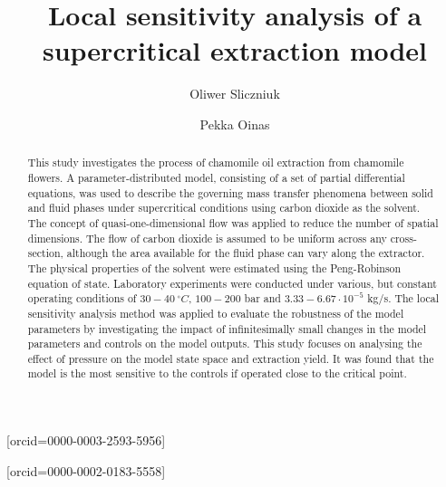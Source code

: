 \documentclass[a4paper,fleqn]{cas-dc}
\begin{document}
 
	
	\title[mode=title]{Local sensitivity analysis of a supercritical extraction model}                      
	
	
	\author[1]{Oliwer Sliczniuk}[orcid=0000-0003-2593-5956]
	\cormark[1]
	
	\author[1]{Pekka Oinas}[orcid=0000-0002-0183-5558]
	
	
	\address[1]{Aalto University, School of Chemical Engineering, Espoo, 02150, Finland}
	
	
	\begin{abstract}
	This study investigates the process of chamomile oil extraction from chamomile flowers. A parameter-distributed model, consisting of a set of partial differential equations, was used to describe the governing mass transfer phenomena between solid and fluid phases under supercritical conditions using carbon dioxide as the solvent. The concept of quasi-one-dimensional flow was applied to reduce the number of spatial dimensions. The flow of carbon dioxide is assumed to be uniform across any cross-section, although the area available for the fluid phase can vary along the extractor. The physical properties of the solvent were estimated using the Peng-Robinson equation of state. Laboratory experiments were conducted under various, but constant operating conditions of $30 - 40~^\circ C$, $100 - 200$ bar and $3.33-6.67 \cdot 10^{-5}$ kg/s. The local sensitivity analysis method was applied to evaluate the robustness of the model parameters by investigating the impact of infinitesimally small changes in the model parameters and controls on the model outputs. This study focuses on analysing the effect of pressure on the model state space and extraction yield. It was found that the model is the most sensitive to the controls if operated close to the critical point.
		
	\end{abstract}
	
\end{document}

